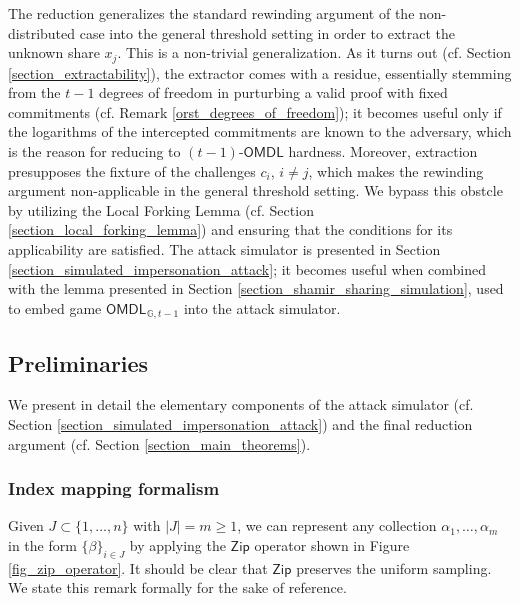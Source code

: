 \documentclass[psamsfonts, reqno]{amsart}
\theoremstyle{definition}
\theoremstyle{remark}
\numberwithin{equation}{section}
\begin{document}
The reduction generalizes the standard rewinding argument
of the non-distributed case
into the general threshold setting
in order to extract the unknown share $x_j$.
This is a non-trivial generalization.
As it turns out
(cf. Section \ref{section_extractability}),
the extractor comes with a residue,
essentially stemming from the
$t-1$ degrees of freedom in purturbing a valid proof
with fixed commitments
(cf. Remark \eqref{orst_degrees_of_freedom});
it becomes useful only if the logarithms
of the intercepted commitments
are known to the adversary,
which is the reason for reducing to
$(t-1)$-$\textsf{OMDL}$ hardness.
Moreover, extraction presupposes the fixture of
the challenges $c_i$, $i \neq j$,
which makes the rewinding argument non-applicable
in the general threshold setting. We bypass this obstcle
by utilizing the Local Forking Lemma
(cf. Section \ref{section_local_forking_lemma})
and ensuring that the conditions for its applicability
are satisfied. The attack simulator is presented
in Section \ref{section_simulated_impersonation_attack};
it becomes useful when combined with the lemma presented in
Section \ref{section_shamir_sharing_simulation},
used to embed game
$\mathsf{OMDL}_{\hspace{1pt}\mathbb{G}, t-1}$
into the attack simulator.

\subsection{Preliminaries}

We present in detail the elementary components of
the attack simulator (cf. Section \ref{section_simulated_impersonation_attack})
and the final reduction argument (cf. Section \ref{section_main_theorems}).

\subsubsection{Index mapping formalism}\label{section_index_mapping_formalism}

Given $J \subset \{1, \dots, n\}$ with $|J| = m \ge 1$,
we can represent any collection $\alpha_1, \dots, \alpha_m$
in the form $\{\beta\}_{i \in J}$ by applying the
$\mathsf{Zip}$ operator shown in Figure \ref{fig_zip_operator}.
It should be clear that $\mathsf{Zip}$ preserves
the uniform sampling. We state this remark
formally for the sake of reference.
\end{document}
